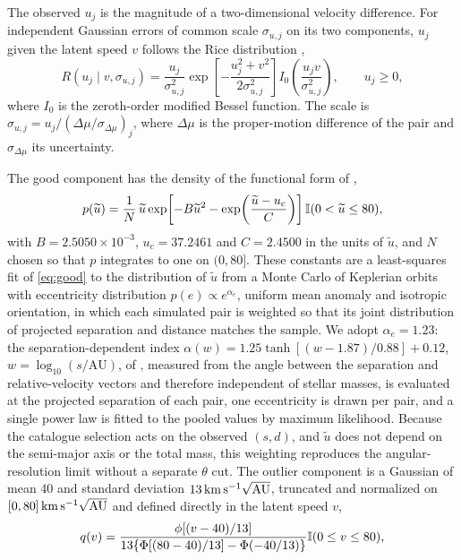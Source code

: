 The observed $u_j$ is the magnitude of a two-dimensional velocity difference. For independent Gaussian errors of common scale $\sigma_{u,j}$ on its two components, $u_j$ given the latent speed $v$ follows the Rice distribution \citep{Rice1945},
\begin{equation}
 R(u_j\mid v,\sigma_{u,j})=\frac{u_j}{\sigma_{u,j}^2}
 \exp\!\left[-\frac{u_j^2+v^2}{2\sigma_{u,j}^2}\right]
 I_0\!\left(\frac{u_jv}{\sigma_{u,j}^2}\right),\qquad u_j\ge0,
 \label{eq:rice}
\end{equation}
where $I_0$ is the zeroth-order modified Bessel function. The scale is $\sigma_{u,j}=u_j/(\Delta\mu/\sigma_{\Delta\mu})_j$, where $\Delta\mu$ is the proper-motion difference of the pair and $\sigma_{\Delta\mu}$ its uncertainty.

The good component has the density of the functional form of \citet{Hwang2024DynamicalMasses},
\begin{equation}
 p(\widetilde u)=\frac{1}{N}\,\widetilde u
 \exp\!\left[-B\widetilde u^2-
 \exp\!\left(\frac{\widetilde u-u_c}{C}\right)\right]
 \mathbb{I}(0<\widetilde u\le80),
 \label{eq:good}
\end{equation}
with $B=2.5050\times10^{-3}$, $u_c=37.2461$ and $C=2.4500$ in the units of $\widetilde u$, and $N$ chosen so that $p$ integrates to one on $(0,80]$. These constants are a least-squares fit of \cref{eq:good} to the distribution of $\widetilde u$ from a Monte Carlo of Keplerian orbits with eccentricity distribution $p(e)\propto e^{\alpha_e}$, uniform mean anomaly and isotropic orientation, in which each simulated pair is weighted so that its joint distribution of projected separation and distance matches the sample. We adopt $\alpha_e=1.23$: the separation-dependent index $\alpha(w)=1.25\tanh[(w-1.87)/0.88]+0.12$, $w=\log_{10}(s/\mathrm{AU})$, of \citet{Hwang2022Eccentricity}, measured from the angle between the separation and relative-velocity vectors and therefore independent of stellar masses, is evaluated at the projected separation of each pair, one eccentricity is drawn per pair, and a single power law is fitted to the pooled values by maximum likelihood. Because the catalogue selection acts on the observed $(s,d)$, and $\widetilde u$ does not depend on the semi-major axis or the total mass, this weighting reproduces the angular-resolution limit without a separate $\theta$ cut. The outlier component is a Gaussian of mean $40$ and standard deviation $13\,\mathrm{km}\,\mathrm{s}^{-1}\sqrt{\mathrm{AU}}$, truncated and normalized on $[0,80]\,\mathrm{km}\,\mathrm{s}^{-1}\sqrt{\mathrm{AU}}$ and defined directly in the latent speed $v$,
\begin{equation}
 q(v)=\frac{\phi[(v-40)/13]}
 {13\{\Phi[(80-40)/13]-\Phi(-40/13)\}}
 \mathbb{I}(0\le v\le80),
 \label{eq:out}
\end{equation}
